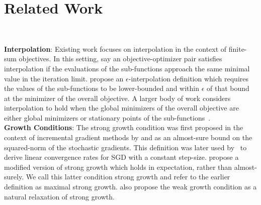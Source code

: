 
\section{Related Work}~\label{sec:related-work}

\noindent \textbf{Interpolation}:
Existing work focuses on interpolation in the context of finite-sum objectives. 
In this setting, \citet{bassily2018exponential} say an objective-optimizer pair satisfies interpolation if the evaluations of the sub-functions approach the same minimal value in the iteration limit. 
\citet{berrada2019training} propose an \( \epsilon \)-interpolation definition which requires the values of the sub-functions to be lower-bounded and within \( \epsilon  \) of that bound at the minimizer of the overall objective. 
A larger body of work considers interpolation to hold when the global minimizers of the overall objective are either global minimizers or stationary points of the sub-functions~\cite{vaswani2019fast, vaswani2019painless, vaswani2020adaptive, meng2020fastandfurious, loizou2020sps}.\\

\noindent \textbf{Growth Conditions}:
The strong growth condition was first proposed in the context of incremental gradient methods by \citet{solodov1998incremental} and \citet{tseng1998incremental} as an almost-sure bound on the squared-norm of the stochastic gradients. 
This definition was later used by~\citet{schmidt2013fast} to derive linear convergence rates for \ac{SGD} with a constant step-size. 
\citet{vaswani2019fast} propose a modified version of strong growth which holds in expectation, rather than almost-surely. 
We call this latter condition strong growth and refer to the earlier definition as maximal strong growth.
\citet{vaswani2019fast} also propose the weak growth condition as a natural relaxation of strong growth. 

